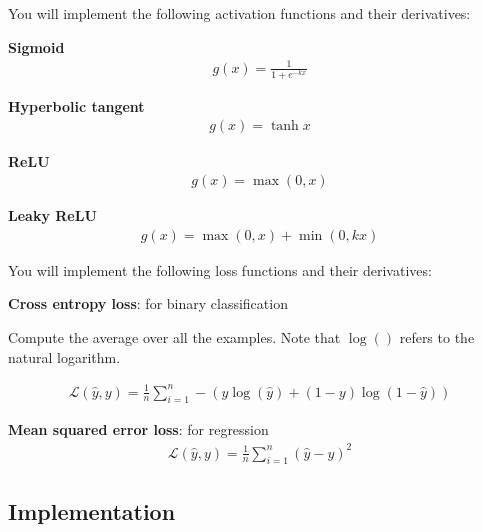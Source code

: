 \documentclass[12pt]{article}
\begin{document}
You will implement the following activation functions and their derivatives:

\textbf{Sigmoid}
\begin{align*}
    g(x) = \frac{1}{1 + e^{-kx}}
\end{align*}

\textbf{Hyperbolic tangent}
\begin{align*}
    g(x) = \tanh{x}
\end{align*}

\textbf{ReLU}
\begin{align*}
    g(x) = \max(0, x)
\end{align*}

\textbf{Leaky ReLU}
\begin{align*}
    g(x) = \max(0, x) + \min(0, kx)
\end{align*}

You will implement the following loss functions and their derivatives:

\textbf{Cross entropy loss}: for binary classification

Compute the average over all the examples. Note that $\log()$ refers to the natural logarithm.

\begin{align*}
    \mathcal{L}(\hat{y}, y) = \frac{1}{n} \sum_{i=1}^n -(y \log(\hat{y}) + (1 - y)\log(1-\hat{y}))
\end{align*}

\textbf{Mean squared error loss}: for regression
\begin{align*}
    \mathcal{L}(\hat{y}, y) = \frac{1}{n} \sum_{i=1}^n (\hat{y} - y)^2
\end{align*}

\subsection{Implementation}
\end{document}
